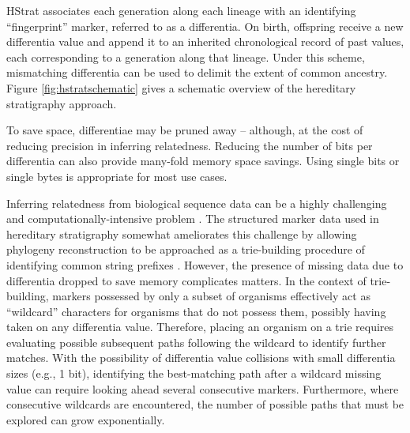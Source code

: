 HStrat associates each generation along each lineage with an identifying ``fingerprint'' marker, referred to as a differentia.
On birth, offspring receive a new differentia value and append it to an inherited chronological record of past values, each corresponding to a generation along that lineage.
Under this scheme, mismatching differentia can be used to delimit the extent of common ancestry.
Figure \ref{fig:hstratschematic} gives a schematic overview of the hereditary stratigraphy approach.

To save space, differentiae may be pruned away -- although, at the cost of reducing precision in inferring relatedness.
Reducing the number of bits per differentia can also provide many-fold memory space savings.
Using single bits or single bytes is appropriate for most use cases.

Inferring relatedness from biological sequence data can be a highly challenging and computationally-intensive problem \citep{miller2010creating}.
The structured marker data used in hereditary stratigraphy somewhat ameliorates this challenge by allowing phylogeny reconstruction to be approached as a trie-building procedure of identifying common string prefixes \citep{delabriandais1959file,moreno2024analysis}.
However, the presence of missing data due to differentia dropped to save memory complicates matters.
In the context of trie-building, markers possessed by only a subset of organisms effectively act as ``wildcard'' characters for organisms that do not possess them, possibly having taken on any differentia value.
Therefore, placing an organism on a trie requires evaluating possible subsequent paths following the wildcard to identify further matches.
With the possibility of differentia value collisions with small differentia sizes (e.g., 1 bit), identifying the best-matching path after a wildcard missing value can require looking ahead several consecutive markers.
Furthermore, where consecutive wildcards are encountered, the number of possible paths that must be explored can grow exponentially.



